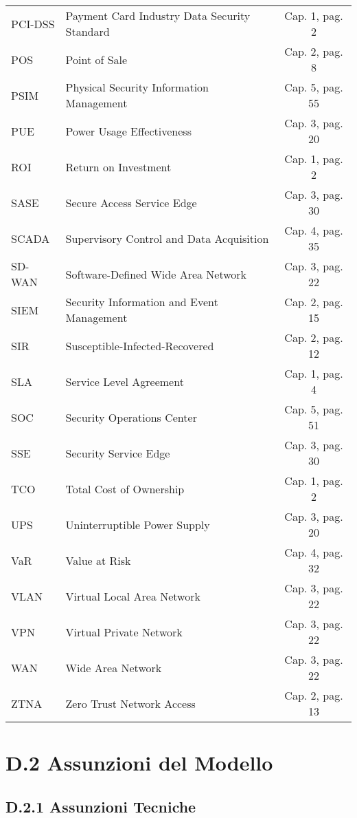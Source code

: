 \begin{table}[htbp]
\begin{tabular}{llc}
PCI-DSS & Payment Card Industry Data Security Standard & Cap. 1, pag. 2 \\
POS & Point of Sale & Cap. 2, pag. 8 \\
PSIM & Physical Security Information Management & Cap. 5, pag. 55 \\
PUE & Power Usage Effectiveness & Cap. 3, pag. 20 \\
ROI & Return on Investment & Cap. 1, pag. 2 \\
SASE & Secure Access Service Edge & Cap. 3, pag. 30 \\
SCADA & Supervisory Control and Data Acquisition & Cap. 4, pag. 35 \\
SD-WAN & Software-Defined Wide Area Network & Cap. 3, pag. 22 \\
SIEM & Security Information and Event Management & Cap. 2, pag. 15 \\
SIR & Susceptible-Infected-Recovered & Cap. 2, pag. 12 \\
SLA & Service Level Agreement & Cap. 1, pag. 4 \\
SOC & Security Operations Center & Cap. 5, pag. 51 \\
SSE & Security Service Edge & Cap. 3, pag. 30 \\
TCO & Total Cost of Ownership & Cap. 1, pag. 2 \\
UPS & Uninterruptible Power Supply & Cap. 3, pag. 20 \\
VaR & Value at Risk & Cap. 4, pag. 32 \\
VLAN & Virtual Local Area Network & Cap. 3, pag. 22 \\
VPN & Virtual Private Network & Cap. 3, pag. 22 \\
WAN & Wide Area Network & Cap. 3, pag. 22 \\
ZTNA & Zero Trust Network Access & Cap. 2, pag. 13 \\
\bottomrule
\end{tabular}
\end{table}

\section{D.2 Assunzioni del Modello}

\subsection{D.2.1 Assunzioni Tecniche}

